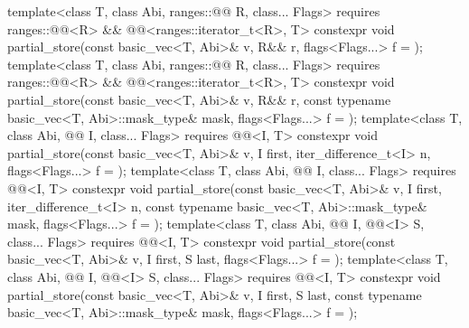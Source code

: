 \begin{itemdecl}
template<class T, class Abi, ranges::@@ R, class... Flags>
  requires ranges::@@<R> && @@<ranges::iterator_t<R>, T>
  constexpr void partial_store(const basic_vec<T, Abi>& v, R&& r, flags<Flags...> f = {});
template<class T, class Abi, ranges::@@ R, class... Flags>
  requires ranges::@@<R> && @@<ranges::iterator_t<R>, T>
  constexpr void partial_store(const basic_vec<T, Abi>& v, R&& r,
    const typename basic_vec<T, Abi>::mask_type& mask, flags<Flags...> f = {});
template<class T, class Abi, @@ I, class... Flags>
  requires @@<I, T>
  constexpr void partial_store(const basic_vec<T, Abi>& v, I first, iter_difference_t<I> n,
                               flags<Flags...> f = {});
template<class T, class Abi, @@ I, class... Flags>
  requires @@<I, T>
  constexpr void partial_store(const basic_vec<T, Abi>& v, I first, iter_difference_t<I> n,
    const typename basic_vec<T, Abi>::mask_type& mask, flags<Flags...> f = {});
template<class T, class Abi, @@ I, @@<I> S, class... Flags>
  requires @@<I, T>
  constexpr void partial_store(const basic_vec<T, Abi>& v, I first, S last,
                               flags<Flags...> f = {});
template<class T, class Abi, @@ I, @@<I> S, class... Flags>
  requires @@<I, T>
  constexpr void partial_store(const basic_vec<T, Abi>& v, I first, S last,
    const typename basic_vec<T, Abi>::mask_type& mask, flags<Flags...> f = {});
\end{itemdecl}

